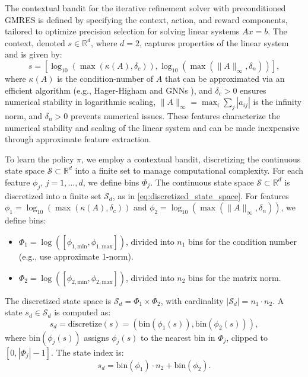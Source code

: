 \documentclass[Afour,sageh,times]{sagej}
\theoremstyle{plain}
\theoremstyle{definition}
\begin{document}
The contextual bandit for the iterative refinement solver with preconditioned GMRES is defined by specifying the context, action, and reward components, tailored to optimize precision selection for solving linear systems $Ax = b$. The context, denoted $s \in \mathbb{R}^d$, where $d=2$, captures properties of the linear system and is given by:
\begin{equation}
s = [\log_{10}(\max(\kappa(A), \delta_c)), \log_{10}(\max(\|A\|_\infty, \delta_n))],
\end{equation}
where $\kappa(A)$ is the condition-number of $A$ that can be approximated via an efficient algorithm (e.g., Hager-Higham \cite{Hager:1984:CE, Higham:1987:SCN} and GNNs \cite{carson26estcond}), and $\delta_c > 0$  ensures numerical stability in logarithmic scaling, $\|A\|_\infty = \max_i \sum_j |a_{ij}|$ is the infinity norm, and $\delta_n > 0$ prevents numerical issues. These features characterize the numerical stability and scaling of the linear system and can be made inexpensive through approximate feature extraction. 





To learn the policy $\pi$, we employ a contextual bandit, discretizing the continuous state space $\mathcal{S} \subset \mathbb{R}^d$ into a finite set to manage computational complexity. For each feature $\phi_j$, $j = 1, \ldots, d$, we define bins $\Phi_j$. The continuous state space $\mathcal{S} \subset \mathbb{R}^d$ is discretized into a finite set $\mathcal{S}_d$, as in \eqref{eq:discretized_state_space}. For features $\phi_1 = \log_{10}(\max(\kappa(A), \delta_c))$ and $\phi_2 = \log_{10}(\max(\|A\|_\infty, \delta_n))$, we define bins:
\begin{itemize}
    \item $\Phi_1 = \log([\phi_{1,\text{min}}, \phi_{1,\text{max}}])$, divided into $n_1$ bins for the condition number (e.g., use approximate 1-norm).
    \item $\Phi_2 = \log([\phi_{2,\text{min}}, \phi_{2,\text{max}}])$, divided into $n_2$ bins for the matrix norm.
\end{itemize}
The discretized state space is $\mathcal{S}_d = \Phi_1 \times \Phi_2$, with cardinality $|\mathcal{S}_d| = n_1 \cdot n_2$. A state $s_d \in \mathcal{S}_d$ is computed as:
\begin{equation}
s_d = \text{discretize}(s) = \left( \text{bin}(\phi_1(s)), \text{bin}(\phi_2(s)) \right),
\end{equation}
where $\text{bin}(\phi_j(s))$ assigns $\phi_j(s)$ to the nearest bin in $\Phi_j$, clipped to $[0, |\Phi_j|-1]$. The state index is:
\begin{equation}
s_d = \text{bin}(\phi_1) \cdot n_2 + \text{bin}(\phi_2).
\end{equation}
\end{document}
